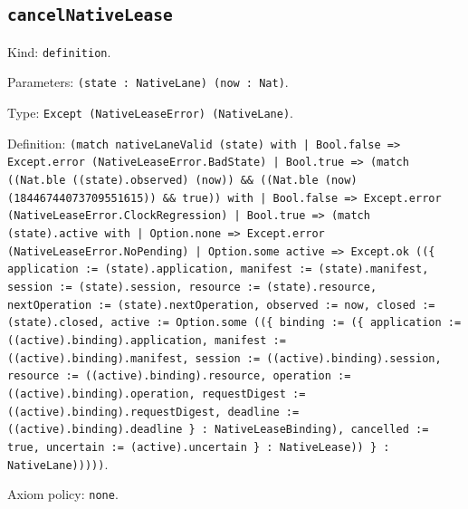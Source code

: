 \documentclass[11pt]{article}
\begin{document}
\subsection*{\texttt{cancelNativeLease}}
\noindent Kind: \texttt{definition}.\par
\noindent Parameters: \texttt{(state : NativeLane) (now : Nat)}.\par
\noindent Type: \texttt{Except (NativeLeaseError) (NativeLane)}.\par
\noindent Definition: \texttt{(match nativeLaneValid (state) with | Bool.false => Except.error (NativeLeaseError.BadState) | Bool.true => (match ((Nat.ble ((state).observed) (now)) \&\& ((Nat.ble (now) (18446744073709551615)) \&\& true)) with | Bool.false => Except.error (NativeLeaseError.ClockRegression) | Bool.true => (match (state).active with | Option.none => Except.error (NativeLeaseError.NoPending) | Option.some active => Except.ok ((\{ application := (state).application, manifest := (state).manifest, session := (state).session, resource := (state).resource, nextOperation := (state).nextOperation, observed := now, closed := (state).closed, active := Option.some ((\{ binding := (\{ application := ((active).binding).application, manifest := ((active).binding).manifest, session := ((active).binding).session, resource := ((active).binding).resource, operation := ((active).binding).operation, requestDigest := ((active).binding).requestDigest, deadline := ((active).binding).deadline \} : NativeLeaseBinding), cancelled := true, uncertain := (active).uncertain \} : NativeLease)) \} : NativeLane)))))}.\par
\noindent Axiom policy: \texttt{none}.\par
\end{document}
